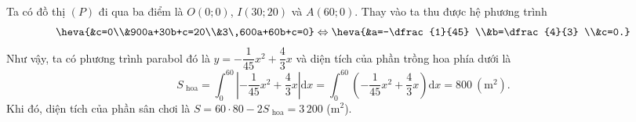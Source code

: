 \begin{bt}
{		Ta có đồ thị $(P)$ đi qua ba điểm là $O(0; 0)$, $I(30; 20)$ và $A(60; 0)$. Thay  vào ta thu được hệ phương trình
		 \[
		 \heva{&c=0\\&900a+30b+c=20\\&3\,600a+60b+c=0} \Leftrightarrow \heva{&a=-\dfrac{1}{45} \\&b=\dfrac{4}{3} \\&c=0.}\]
		Như vậy, ta có phương trình parabol đó  là $y=-\dfrac{1}{45} x^2+\dfrac{4}{3} x$ và diện tích của phần trồng hoa phía dưới là
		 $$
		S_{\text{ hoa}}=\displaystyle\int_0^{60} \left\lvert-\dfrac{1}{45} x^2+\dfrac{4}{3}x\right\vert \mathrm{d}  x=\displaystyle\int_0^{60}\left(-\dfrac{1}{45} x^2+\dfrac{4}{3} x\right)\mathrm{d}x=800~(\mathrm{m}^2).
		$$ 
		 Khi đó, diện tích của phần sân chơi là $S=60\cdot 80-2S_{\text{ hoa}}=3\,200$ (m$^2$).
	 }
\end{bt}

